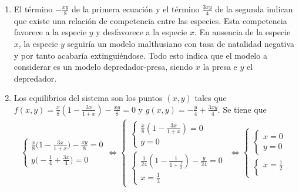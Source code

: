\documentclass[11pt]{report}
\begin{document}
\begin{solution}
    \hfill
    \begin{enumerate}
        \item El término $-\frac{xy}{8}$ de la primera ecuación y el término $\frac{3xy}{4}$ de la segunda indican que existe una relación de competencia entre las especies. Esta competencia favorece a la especie $y$ y desfavorece a la especie $x$. En ausencia de la especie $x$, la especie $y$ seguiría un modelo malthusiano con tasa de natalidad negativa y por tanto acabaría extinguiéndose. Todo esto indica que el modelo a considerar es un modelo depredador-presa, siendo $x$ la presa e $y$ el depredador.
        \item Los equilibrios del sistema son los puntos $(x,y)$ tales que $f(x,y)=\frac{x}{8}(1-\frac{3x}{1+x})-\frac{xy}{8} = 0$ y $g(x,y) = -\frac{y}{4}+\frac{3xy}{4}$. Se tiene que
        \begin{align*}
            \begin{cases}
                \displaystyle \frac{x}{8}\bigl(1-\frac{3x}{1+x}\bigr)-\frac{xy}{8} = 0 \\[10pt]
                \displaystyle y\bigl(-\frac{1}{4}+\frac{3x}{4}\bigr) = 0
            \end{cases} \iff \begin{cases}
                \begin{cases}
                    \displaystyle \frac{x}{8}(1-\frac{3x}{1+x}) = 0 \\[10pt]
                    y = 0
                \end{cases} \\[25pt]
                \begin{cases}
                    \displaystyle \frac{1}{24}(1-\frac{1}{1+\frac{1}{3}})-\frac{y}{24} = 0 \\[10pt]
                    \displaystyle x = \frac{1}{3}
                \end{cases}
            \end{cases} \iff \begin{cases}
                \begin{cases}
                    x = 0 \\[10pt]
                    y = 0
                \end{cases} \\[25pt]
                \begin{cases}
                    \displaystyle x = \frac{1}{2} \\[10pt]

\end{cases}
\end{cases}
\end{align*}
\end{enumerate}
\end{solution}
\end{document}
